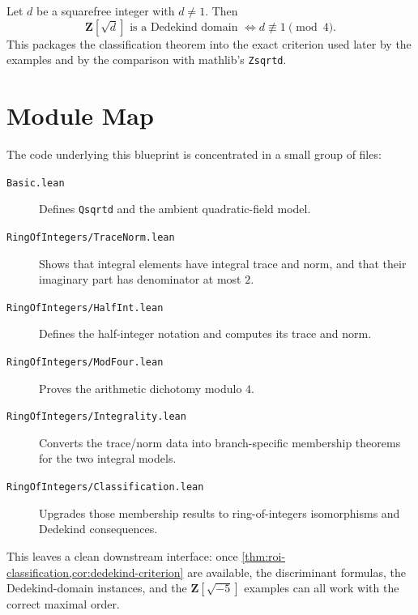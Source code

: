 \begin{corollary}%
\label{cor:dedekind-criterion}%
\leanok
{}
Let $d$ be a squarefree integer with $d \neq 1$. Then
\[
  \mathbf{Z}[\sqrt d] \text{ is a Dedekind domain }
  \iff
  d \not\equiv 1 \pmod 4.
\]
This packages the classification theorem into the exact criterion used later by
the examples and by the comparison with mathlib's \verb|Zsqrtd|.
\end{corollary}

\chapter{Module Map}

The code underlying this blueprint is concentrated in a small group of files:
\begin{description}
\item[\texttt{Basic.lean}] Defines \verb|Qsqrtd| and the ambient quadratic-field
model.
\item[\texttt{RingOfIntegers/TraceNorm.lean}] Shows that integral elements have
integral trace and norm, and that their imaginary part has denominator at most
$2$.
\item[\texttt{RingOfIntegers/HalfInt.lean}] Defines the half-integer notation and
computes its trace and norm.
\item[\texttt{RingOfIntegers/ModFour.lean}] Proves the arithmetic dichotomy
modulo $4$.
\item[\texttt{RingOfIntegers/Integrality.lean}] Converts the trace/norm data into
branch-specific membership theorems for the two integral models.
\item[\texttt{RingOfIntegers/Classification.lean}] Upgrades those membership
results to ring-of-integers isomorphisms and Dedekind consequences.
\end{description}

This leaves a clean downstream interface: once
\cref{thm:roi-classification,cor:dedekind-criterion} are available, the
discriminant formulas, the Dedekind-domain instances, and the
$\mathbf{Z}[\sqrt{-5}]$ examples can all work with the correct maximal order.
